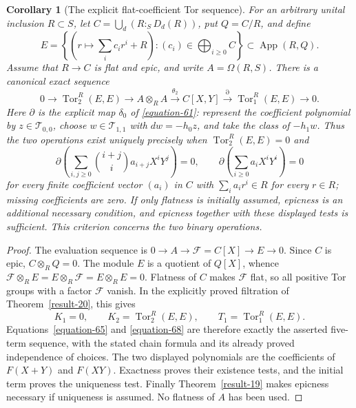 \documentclass[11pt,a4paper]{article}
\newtheorem{corollary}[theorem]{Corollary}
\theoremstyle{definition}
\begin{document}
\begin{corollary}[The explicit flat-coefficient Tor sequence]\label{result-49}
For an arbitrary unital inclusion $R\subset S$, let
$C=\bigcup_d(R:_S D_d(R))$, put $Q=C/R$, and define
\[
 E=\left\{\left(r\longmapsto\sum_i c_i r^i+R\right):
                    (c_i)\in\bigoplus_{i\ge0}C\right\}
       \subset\operatorname{App}(R,Q).
\]
Assume that $R\to C$ is flat and epic, and write $A=\Omega(R,S)$.
There is a canonical exact sequence
\[
 0\longrightarrow\operatorname{Tor}_2^R(E,E)
 \longrightarrow A\otimes_R A\xrightarrow{\theta_2}C[X,Y]
 \xrightarrow{\partial}\operatorname{Tor}_1^R(E,E)
 \longrightarrow0.
\]
Here $\partial$ is the explicit map $\delta_0$ of
\eqref{equation-61}: represent the coefficient polynomial by
$z\in\mathcal T_{0,0}$, choose $w\in\mathcal T_{1,1}$ with
$dw=-h_0z$, and take the class of $-h_1w$.
Thus the two operations exist uniquely precisely when
$\operatorname{Tor}_2^R(E,E)=0$ and
\[
 \partial\!\left(\sum_{i,j\ge0}\binom{i+j}{i}a_{i+j}X^iY^j\right)=0,
 \qquad
 \partial\!\left(\sum_{i\ge0}a_iX^iY^i\right)=0
\]
for every finite coefficient vector $(a_i)$ in $C$ with
$\sum_i a_i r^i\in R$ for every $r\in R$; missing coefficients are
zero. If only flatness is initially assumed, epicness is an additional
necessary condition, and epicness together with these displayed tests
is sufficient. This criterion concerns the two binary operations.
\end{corollary}
\begin{proof}
The evaluation sequence is
$0\to A\to\mathcal F=C[X]\to E\to0$. Since $C$ is epic,
$C\otimes_R Q=0$. The module $E$ is a quotient of $Q[X]$, whence
$\mathcal F\otimes_R E=E\otimes_R\mathcal F=E\otimes_RE=0$.
Flatness of $C$ makes $\mathcal F$ flat, so all positive Tor groups
with a factor $\mathcal F$ vanish. In the explicitly proved
filtration of Theorem~\ref{result-20}, this gives
\[
 K_1=0,\qquad K_2=\operatorname{Tor}_2^R(E,E),\qquad
 T_1=\operatorname{Tor}_1^R(E,E).
\]
Equations~\eqref{equation-65} and \eqref{equation-68} are therefore
exactly the asserted five-term sequence, with the stated chain formula
and its already proved independence of choices. The two displayed
polynomials are the coefficients of $F(X+Y)$ and $F(XY)$.
Exactness proves their existence tests, and the initial term proves
the uniqueness test. Finally Theorem~\ref{result-19} makes epicness
necessary if uniqueness is assumed. No flatness of $A$ has been used.
\end{proof}
\end{document}
